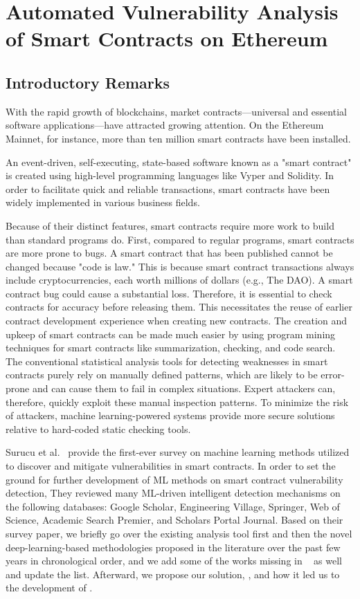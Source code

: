 \chapter{Automated Vulnerability Analysis of Smart Contracts on Ethereum} 
\label{ch:Slither-simil}

\section{Introductory Remarks}
With the rapid growth of blockchains, market contracts—universal and essential software applications—have attracted growing attention.
On the Ethereum Mainnet, for instance, more than ten million smart contracts have been installed.

An event-driven, self-executing, state-based software known as a "smart contract" is created using high-level programming languages like Vyper and Solidity.
In order to facilitate quick and reliable transactions, smart contracts have been widely implemented in various business fields.

Because of their distinct features, smart contracts require more work to build than standard programs do.
First, compared to regular programs, smart contracts are more prone to bugs.
A smart contract that has been published cannot be changed because "code is law."
This is because smart contract transactions always include cryptocurrencies, each worth millions of dollars (e.g., The DAO).
A smart contract bug could cause a substantial loss.
Therefore, it is essential to check contracts for accuracy before releasing them.
This necessitates the reuse of earlier contract development experience when creating new contracts.
The creation and upkeep of smart contracts can be made much easier by using program mining techniques for smart contracts like summarization, checking, and code search.
The conventional statistical analysis tools for detecting weaknesses in smart contracts purely rely on manually defined patterns, which are likely to be error-prone and can cause them to fail in complex situations.
Expert attackers can, therefore, quickly exploit these manual inspection patterns.
To minimize the risk of attackers, machine learning-powered systems provide more secure solutions relative to hard-coded static checking tools.

Surucu et al.~\cite{surucu2022survey} provide the first-ever survey on machine learning methods utilized to discover and mitigate vulnerabilities in smart contracts.
In order to set the ground for further development of ML methods on smart contract vulnerability detection, They reviewed many ML-driven intelligent detection mechanisms on the following databases:
Google Scholar, Engineering Village, Springer, Web of Science, Academic Search Premier, and Scholars Portal Journal.
Based on their survey paper, we briefly go over the existing analysis tool first and then the novel deep-learning-based methodologies proposed in the literature over the past few years
in chronological order, and we add some of the works missing in ~\cite{surucu2022survey} as well and update the list.
Afterward, we propose our solution, \slithersimil, and how it led us to the development of \etherbase.



